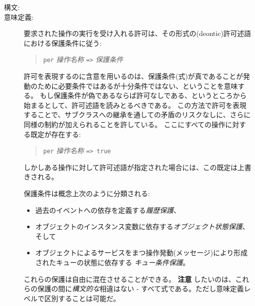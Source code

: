 \documentclass[\pformat,12pt]{jarticle}
\newcommand{\vppsmall}{\small\tt}
\begin{document}
\begin{description}
\item[構文:] 


\item[意味定義:] 要求された操作の実行を受け入れる許可は、その形式の(deontic)許可述語における保護条件に従う:

\begin{quote}
{\vppsmall per} {\em 操作名称} {\vppsmall =>} {\em 保護条件}
\end{quote}

許可を表現するのに含意を用いるのは、保護条件(式)が真であることが発動のために必要条件ではあるが十分条件ではない、ということを意味する。
もし保護条件が偽であるならば許可なしである、というところから始まるとして、許可述語を読みとるべきである。
この方法で許可を表現することで、サブクラスへの継承を通しての矛盾のリスクなしに、さらに同様の制約が加えられることを許している。
ここにすべての操作に対する既定が存在する:

\begin{quote}
{\vppsmall per} {\em 操作名称} {\vppsmall => true}
\end{quote}

しかしある操作に対して許可述語が指定された場合には、この既定は上書きされる。

保護条件は概念上次のように分類される:
\begin{itemize}
\item
過去のイベントへの依存を定義する{\em 履歴保護}、
\item
オブジェクトのインスタンス変数に依存する{\em オブジェクト状態保護}、そして
\item
オブジェクトによるサービスをまつ操作発動(メッセージ)により形成されたキューの状態に依存する {\em キュー条件保護}。
\end{itemize}
これらの保護は自由に混在させることができる。
\textbf{注意} したいのは、これらの保護の間に\textit{構文的な}相違はない - すべて式である。ただし意味定義レベルで区別することは可能だ。


\end{description}
\end{document}

